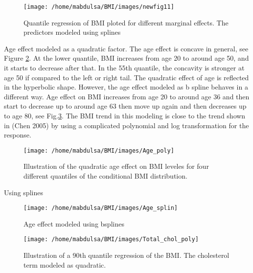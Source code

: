 \documentclass[
  12pt,
]{article}
\begin{document}
\begin{figure}

{\centering \texttt{[image: /home/mabdulsa/BMI/images/newfig11]} 

}

\caption{Quantile regression of BMI ploted  for different marginal effects. The predictors modeled using splines }\label{fig:resu12}
\end{figure}

Age effect modeled as a quadratic factor. The age effect is concave in general, see Figure \ref{fig:resu3}. At the lower quantile, BMI increases from age 20 to around age 50, and it starts to decrease after that. In the 55th quantile, the concavity is stronger at age 50 if compared to the left or right tail. The quadratic effect of age is reflected in the hyperbolic shape. However, the age effect modeled as b spline behaves in a different way. Age effect on BMI increases from age 20 to around age 36 and then start to decrease up to around age 63 then move up again and then decreases up to age 80, see Fig.\ref{fig:resu33}. The BMI trend in this modeling is close to the trend shown in (Chen 2005) by using a complicated polynomial and log transformation for the response.

\begin{figure}

{\centering \texttt{[image: /home/mabdulsa/BMI/images/Age\_poly]} 

}

\caption{Illustration of the quadratic age effect on BMI leveles for four different quantiles of the conditional BMI distribution. }\label{fig:resu3}
\end{figure}

Using splines

\begin{figure}

{\centering \texttt{[image: /home/mabdulsa/BMI/images/Age\_splin]} 

}

\caption{Age effect modeled using bsplines }\label{fig:resu33}
\end{figure}

\begin{figure}

{\centering \texttt{[image: /home/mabdulsa/BMI/images/Total\_chol\_poly]} 

}

\caption{Illustration of a 90th quantile regression of the BMI. The cholesterol term modeled as  quadratic.}\label{fig:resu4}
\end{figure}
\end{document}
